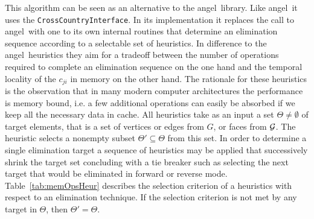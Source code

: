\documentclass{book}
\newcommand{\angel}{angel}
\newcommand{\code}[1]{{\small\tt{#1}}}
\newcommand{\reftab}[1]{{Table~\ref{#1}}}
\begin{document}
This algorithm can be seen as an alternative to the \angel\ library. 
Like \angel\ it uses the \code{CrossCountryInterface}. In its implementation 
it replaces the call to \angel\ with one to its own internal routines that
determine an elimination sequence according to a selectable set of heuristics. 
In difference to the \angel\ heuristics  they 
aim for a tradeoff between the number of operations required to complete an elimination 
sequence on the one hand and the temporal locality of the $c_{ji}$ in memory on the other hand. 
The rationale for these heuristics is the observation that in many modern 
computer architectures the performance is memory bound, i.e. a few additional 
operations can easily be absorbed if we keep all the necessary data in cache. 
All heuristics take as an input a set $\Theta \neq \emptyset $ of target elements, that is 
a set of vertices or edges from $G$, or faces from $\cal G$. 
The heuristic selects a nonempty subset $\Theta'\subseteq \Theta $ from this set. 
In order to determine a single elimination target a sequence of heuristics may be applied 
that successively shrink the target set concluding with a tie breaker such as 
selecting the next target that would be eliminated in forward or reverse mode. 
\reftab{tab:memOpsHeur} describes the selection criterion of a heuristics with 
respect to an elimination technique.  If the selection criterion is not met 
by any target in $\Theta$, then $\Theta'=\Theta$. 
\end{document}
